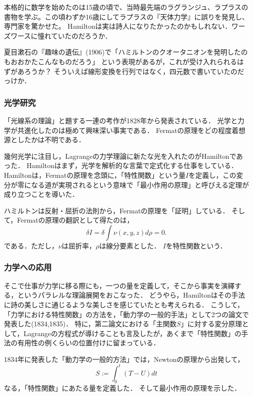 \documentclass[uplatex,dvipdfmx]{jsreport}
\begin{document}
\begin{history}
    本格的に数学を始めたのは15歳の頃で、当時最先端のラグランジュ、ラプラスの書物を学ぶ。この頃わずか16歳にしてラプラスの『天体力学』に誤りを発見し、専門家を驚かせた。
    Hamiltonは実は詩人になりたかったのかもしれない．ワーズワースに憧れていたのだろうか．

    夏目漱石の『趣味の遺伝』(1906)で「ハミルトンのクオータニオンを発明したのもおおかたこんなものだろう」
    という表現があるが，これが受け入れられるはずがあろうか？
    そういえば線形変換を行列ではなく，四元数で書いていたのだっけか．
\end{history}

\subsubsection{光学研究}

\begin{tcolorbox}[colframe=ForestGreen, colback=ForestGreen!10!white,breakable,colbacktitle=ForestGreen!40!white,coltitle=black,fonttitle=\bfseries\sffamily,
title=]
    「光線系の理論」と題する一連の考作が1828年から発表されている．
    光学と力学が共進化したのは極めて興味深い事実である．
    Fermatの原理をどの程度着想源としたかは不明である．
\end{tcolorbox}

\begin{history}
    幾何光学に注目し，Lagrangeの力学理論に新たな光を入れたのがHamiltonであった．
    Hamiltonはまず，光学を解析的な言葉で定式化する仕事をしている．
    Hamiltonは，Fermatの原理を念頭に，「特性関数」という量$I$を定義し，この変分が零になる道が実現されるという意味で「最小作用の原理」と呼びえる定理が成り立つことを導いた．

    ハミルトンは反射・屈折の法則から，Fermatの原理を「証明」している．
    そして，Fermatの原理の翻訳として得たのは，
    \[\delta I=\delta\int\nu(x,y,z)d\rho=0.\]
    である．ただし，$\nu$は屈折率，$\rho$は線分要素とした．
    $I$を特性関数という．
\end{history}

\subsubsection{力学への応用}

\begin{history}
    そこで仕事が力学に移る際にも，一つの量を定義して，そこから事実を演繹する，というパラレルな理論展開をおこなった．
    どうやら，Hamiltonはその手法に詩の美しさに通じるような美しさを感じていたとも考えられる．
    こうして，「力学における特性関数」の方法を，「動力学の一般的手法」として2つの論文で発表した(1834\cite{Hamilton34},1835\cite{Hamilton35})．
    特に，第二論文における「主関数$S$」に対する変分原理として，Lagrangeの方程式が導けることも言及したが，あくまで「特性関数」の手法の有用性の例くらいの位置付けに留まっている．

    1834年に発表した「動力学の一般的方法」\cite{Hamilton34}では，Newtonの原理から出発して，
    \[S:=\int^t_0(T-U)dt\]
    なる，「特性関数」にあたる量を定義した．
    そして最小作用の原理を示した．
\end{history}
\end{document}
